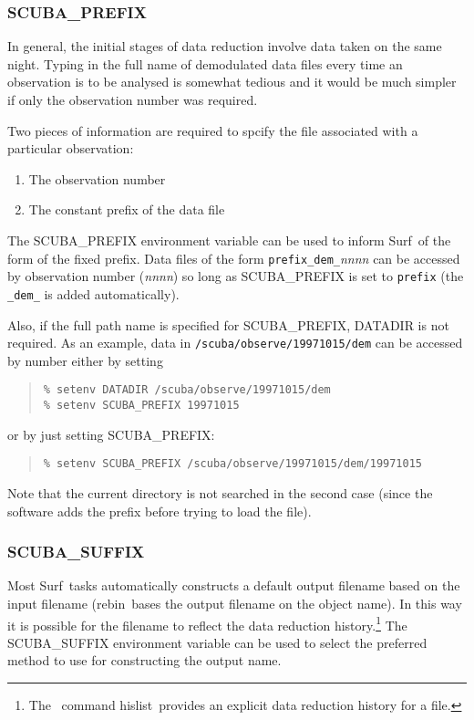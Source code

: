 \documentclass[twoside,11pt]{article}
\newcommand{\scusoft}          {{\sc Surf}}
\newcommand{\Kappa}{\xref{{\sc{Kappa}}}{sun95}{}}
\newcommand{\task}[1]{{\sf #1}}
\newcommand{\rebin}{\htmlref{\task{rebin}}{REBIN}}
\newcommand{\hislist}{\xref{\task{hislist}}{sun95}{HISLIST}}
\newenvironment{myquote}{\begin{quote}\begin{small}}{\end{small}\end{quote}}
\newcommand{\htmlref}[2]{#1}
\newcommand{\xref}[3]{#1}
\begin{document}
\subsubsection{SCUBA\_PREFIX}

In general, the initial stages of data reduction involve data taken on the
same night. Typing in the full name of demodulated data files every time an
observation is to be analysed is somewhat tedious and it would be much simpler 
if only the observation number was required.

Two pieces of information are required to spcify the file associated with a
particular observation:
\begin{enumerate}
\item The observation number
\item The constant prefix of the data file
\end{enumerate}

The SCUBA\_PREFIX environment variable can be used to inform \scusoft\
of the form of the fixed prefix. Data files of the form
\texttt{prefix\_dem\_}\textit{nnnn} can be accessed by observation number
(\textit{nnnn}) so long as SCUBA\_PREFIX is set to \texttt{prefix} (the
\texttt{\_dem\_} is added automatically).

Also, if the full path name is specified for SCUBA\_PREFIX, DATADIR is not
required. As an example, data in \texttt{/scuba/observe/19971015/dem}
can be accessed by number either by setting
\begin{myquote}
\begin{verbatim}
% setenv DATADIR /scuba/observe/19971015/dem
% setenv SCUBA_PREFIX 19971015
\end{verbatim}
\end{myquote}
or by just setting SCUBA\_PREFIX:
\begin{myquote}
\begin{verbatim}
% setenv SCUBA_PREFIX /scuba/observe/19971015/dem/19971015
\end{verbatim}
\end{myquote}
Note that the current directory is not searched in the second case (since the
software adds the prefix before trying to load the file).



\subsubsection{SCUBA\_SUFFIX}

Most \scusoft\ tasks automatically constructs a default output filename based
on the input filename (\rebin\ bases the output filename on the object name).
In this way it is possible for the filename to reflect the data reduction
history.\footnote{The \Kappa\ command \hislist\ provides an explicit data
reduction history for a file.}
The SCUBA\_SUFFIX environment variable can be used to select the preferred 
method to use for constructing the output name.
\end{document}
